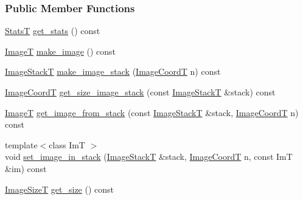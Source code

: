 \subsubsection*{Public Member Functions}
\begin{DoxyCompactItemize}
\item 
\hyperlink{namespacemappel_a04ab395b0cf82c4ce68a36b2212649a5}{StatsT} \hyperlink{classmappel_1_1ImageFormat1DBase_ac6b74b16ce0a764516cc2686ee8cd60f}{get\+\_\+stats} () const 
\item 
\hyperlink{classmappel_1_1ImageFormat1DBase_a521a1ff391a52a636fac4aac7c7ba02c}{ImageT} \hyperlink{classmappel_1_1ImageFormat1DBase_afa59b2dd9ba997262fa17ef7d1122996}{make\+\_\+image} () const 
\item 
\hyperlink{classmappel_1_1ImageFormat1DBase_a81e3246d1c5c37ebf9077b7b5bd25a76}{Image\+StackT} \hyperlink{classmappel_1_1ImageFormat1DBase_ab2c4470c335a6abb2d3b9c442339ca0c}{make\+\_\+image\+\_\+stack} (\hyperlink{classmappel_1_1ImageFormat1DBase_a82ab3168eb1a87eaeb3e7c919188e9fc}{Image\+CoordT} n) const 
\item 
\hyperlink{classmappel_1_1ImageFormat1DBase_a82ab3168eb1a87eaeb3e7c919188e9fc}{Image\+CoordT} \hyperlink{classmappel_1_1ImageFormat1DBase_afa0e79b58955f5ecfd39c8f8d06f22ad}{get\+\_\+size\+\_\+image\+\_\+stack} (const \hyperlink{classmappel_1_1ImageFormat1DBase_a81e3246d1c5c37ebf9077b7b5bd25a76}{Image\+StackT} \&stack) const 
\item 
\hyperlink{classmappel_1_1ImageFormat1DBase_a521a1ff391a52a636fac4aac7c7ba02c}{ImageT} \hyperlink{classmappel_1_1ImageFormat1DBase_a92d3d803a82402adcca516b53e8d5100}{get\+\_\+image\+\_\+from\+\_\+stack} (const \hyperlink{classmappel_1_1ImageFormat1DBase_a81e3246d1c5c37ebf9077b7b5bd25a76}{Image\+StackT} \&stack, \hyperlink{classmappel_1_1ImageFormat1DBase_a82ab3168eb1a87eaeb3e7c919188e9fc}{Image\+CoordT} n) const 
\item 
{\footnotesize template$<$class ImT $>$ }\\void \hyperlink{classmappel_1_1ImageFormat1DBase_a90fcfb6e39374e4372ec1cedf3c2cb91}{set\+\_\+image\+\_\+in\+\_\+stack} (\hyperlink{classmappel_1_1ImageFormat1DBase_a81e3246d1c5c37ebf9077b7b5bd25a76}{Image\+StackT} \&stack, \hyperlink{classmappel_1_1ImageFormat1DBase_a82ab3168eb1a87eaeb3e7c919188e9fc}{Image\+CoordT} n, const ImT \&im) const 
\item 
\hyperlink{classmappel_1_1ImageFormat1DBase_a6456bab2b26702022ee32ae19e90dcac}{Image\+SizeT} \hyperlink{classmappel_1_1ImageFormat1DBase_aea1194302eccc0d8ad62394176aa6b0c}{get\+\_\+size} () const 

\end{DoxyCompactItemize}
